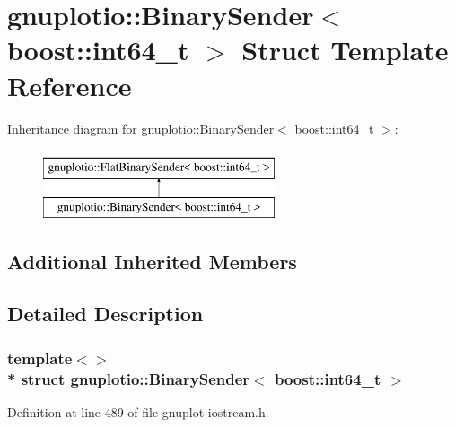 \hypertarget{structgnuplotio_1_1_binary_sender_3_01boost_1_1int64__t_01_4}{}\section{gnuplotio\+:\+:Binary\+Sender$<$ boost\+:\+:int64\+\_\+t $>$ Struct Template Reference}
\label{structgnuplotio_1_1_binary_sender_3_01boost_1_1int64__t_01_4}
Inheritance diagram for gnuplotio\+:\+:Binary\+Sender$<$ boost\+:\+:int64\+\_\+t $>$\+:\begin{figure}[H]
\begin{center}
\leavevmode
\includegraphics[height=2.000000cm]{structgnuplotio_1_1_binary_sender_3_01boost_1_1int64__t_01_4}
\end{center}
\end{figure}
\subsection*{Additional Inherited Members}


\subsection{Detailed Description}
\subsubsection*{template$<$$>$\\*
struct gnuplotio\+::\+Binary\+Sender$<$ boost\+::int64\+\_\+t $>$}



Definition at line 489 of file gnuplot-\/iostream.\+h.

